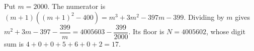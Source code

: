 Put $m=2000$. The numerator is $(m+1)((m+1)^2-400)=m^3+3m^2-397m-399$. Dividing by $m$ gives $m^2+3m-397-\dfrac{399}{m}=4005603-\dfrac{399}{2000}$. Its floor is $N=4005602$, whose digit sum is $4+0+0+5+6+0+2=\boxed{17}$.
